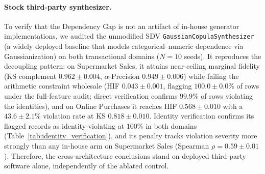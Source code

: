 \documentclass[pdflatex,sn-mathphys-num]{sn-jnl}
\theoremstyle{thmstyleone}%
\theoremstyle{thmstyletwo}%
\theoremstyle{thmstylethree}%
\begin{document}
\paragraph{Stock third-party synthesizer.} To verify that the Dependency Gap is not an artifact of in-house generator implementations, we audited the unmodified SDV \texttt{GaussianCopulaSynthesizer} (a widely deployed baseline that models categorical--numeric dependence via Gaussianization) on both transactional domains ($N=10$ seeds). It reproduces the decoupling pattern: on Supermarket Sales, it attains near-ceiling marginal fidelity (KS complement $0.962 \pm 0.004$, $\alpha$-Precision $0.949 \pm 0.006$) while failing the arithmetic constraint wholesale (HIF $0.043 \pm 0.001$, flagging $100.0 \pm 0.0\%$ of rows under the full-feature audit; direct verification confirms $99.9\%$ of rows violating the identities), and on Online Purchases it reaches HIF $0.568 \pm 0.010$ with a $43.6 \pm 2.1\%$ violation rate at KS $0.818 \pm 0.010$. Identity verification confirms its flagged records as identity-violating at $100\%$ in both domains (Table~\ref{tab:identity_verification}), and its penalty tracks violation severity more strongly than any in-house arm on Supermarket Sales (Spearman $\rho = 0.59 \pm 0.01$). Therefore, the cross-architecture conclusions stand on deployed third-party software alone, independently of the ablated control.
\end{document}
